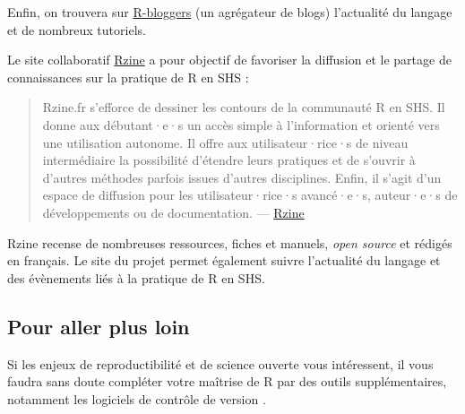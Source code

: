 \documentclass[
  french,
]{scrbook}
\begin{document}
Enfin, on trouvera sur \href{https://www.r-bloggers.com/}{R-bloggers} (un agrégateur de blogs) l'actualité du langage et de nombreux tutoriels.

\begin{tcolorbox}[fonttitle=\sffamily\bfseries\large,title=Conseil,colframe=darkcyan]

Le site collaboratif \href{https://rzine.fr/}{Rzine} a pour objectif de favoriser la diffusion et le partage de connaissances sur la pratique de R en SHS :

\begin{quote}
Rzine.fr s'efforce de dessiner les contours de la communauté R en SHS. Il donne aux débutant·e·s un accès simple à l'information et orienté vers une utilisation autonome. Il offre aux utilisateur·rice·s de niveau intermédiaire la possibilité d'étendre leurs pratiques et de s'ouvrir à d'autres méthodes parfois issues d'autres disciplines. Enfin, il s'agit d'un espace de diffusion pour les utilisateur·rice·s avancé·e·s, auteur·e·s de développements ou de documentation. --- \href{https://rzine.fr}{Rzine}
\end{quote}

Rzine recense de nombreuses ressources, fiches et manuels, \emph{open source} et rédigés en français. Le site du projet permet également suivre l'actualité du langage et des évènements liés à la pratique de R en SHS.

\end{tcolorbox}

\hypertarget{pour-aller-plus-loin}{%
\subsection*{Pour aller plus loin}\label{pour-aller-plus-loin}}

Si les enjeux de reproductibilité et de science ouverte vous intéressent, il vous faudra sans doute compléter votre maîtrise de R par des outils supplémentaires, notamment les logiciels de contrôle de version \autocite{bryan2021}.
\end{document}
